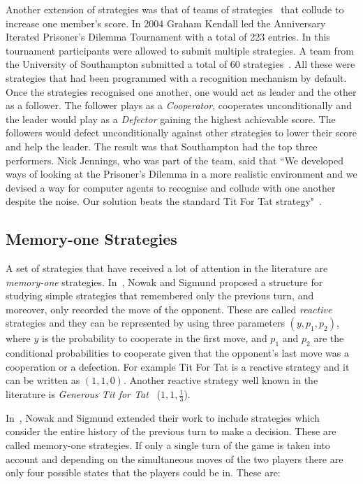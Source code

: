 Another extension of strategies was that of teams of
strategies~\cite{J.P.Delahaye1993Lp, J.P.Delahaye1995LIeP, A.Rogers2007Ctpw}
that collude to increase one member's score. In 2004 Graham Kendall led the
Anniversary Iterated Prisoner's Dilemma Tournament with a total of 223 entries.
In this tournament participants were allowed to submit multiple strategies. A
team from the University of Southampton submitted a total of 60
strategies~\cite{A.Rogers2007Ctpw}. All these were strategies that had been
programmed with a recognition mechanism by default. Once the strategies
recognised one another, one would act as leader and the other as a follower. The
follower plays as a \textit{Cooperator}, cooperates unconditionally and the
leader would play as a \textit{Defector} gaining the highest achievable score.
The followers would defect unconditionally against other strategies to lower
their score and help the leader. The result was that Southampton had the top
three performers. Nick Jennings, who was part of the team, said that ``We
developed ways of looking at the Prisoner's Dilemma in a more realistic
environment and we devised a way for computer agents to recognise and collude
with one another despite the noise. Our solution beats the standard Tit For Tat
strategy"~\cite{southampton_blog}.

\subsection{Memory-one Strategies}\label{section:memory_one}

A set of strategies that have received a lot of attention in
the literature are \textit{memory-one} strategies. In~\cite{Nowak1989},
Nowak and Sigmund proposed a structure for studying simple strategies that
remembered only the previous turn, and moreover, only recorded the move of the
opponent. These are called \textit{reactive} strategies and they can be
represented by using three parameters \((y, p_1, p_2)\), where \(y\) is the
probability to cooperate in the first move, and \(p_1\) and \(p_2\) are the
conditional probabilities to cooperate given that the opponent's last move was
a cooperation or a defection. For example Tit For Tat is a reactive strategy and
it can be written as \((1, 1, 0)\). Another reactive strategy well known in
the literature is \textit{Generous Tit for Tat}~\cite{Nowak1992} (\(1, 1, \frac{1}{3}\)).

In~\cite{Nowak1990}, Nowak and Sigmund extended
their work to include strategies which consider the entire history of the previous turn to make a decision.
These are called memory-one strategies.
If only a single turn of the game is taken into account and depending on the
simultaneous moves of the two players there are only four possible states that
the players could be in. These are:

